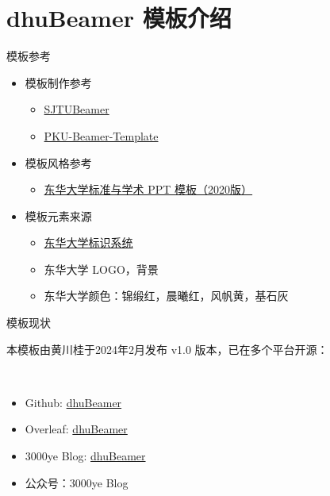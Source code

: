 \documentclass[12pt]{beamer}
\begin{document}
\section{dhuBeamer 模板介绍}
\begin{frame}{模板参考}

    \begin{itemize}
        \item 模板制作参考
        \begin{itemize}
            \item \href{https://github.com/sjtug/SJTUBeamer}{SJTUBeamer}
            \item \href{https://www.overleaf.com/latex/templates/bei-da-zhong-wen-mo-ban-pku-beamer-template/kfxpbtzrqhrn}{PKU-Beamer-Template}
        \end{itemize}
        \item 模板风格参考
        \begin{itemize}
            \item \href{https://www.dhu.edu.cn/_upload/article/files/d2/8c/2137ec0c44238fd6fbd3ee28ff07/9f9b566a-67f1-4717-991f-477ee5b43acb.zip}{东华大学标准与学术 PPT 模板（2020版）}
        \end{itemize}
        \item 模板元素来源
        \begin{itemize}
            \item \href{https://www.dhu.edu.cn/bsxt/listm.htm}{东华大学标识系统}
            \item 东华大学 LOGO，背景
            \item 东华大学颜色：锦缎红，晨曦红，风帆黄，基石灰
        \end{itemize}
    \end{itemize}

\end{frame}

\begin{frame}{模板现状}

    本模板由黄川桂于2024年2月发布 v1.0 版本，已在多个平台开源：

    ~\par

    \begin{itemize}
        \item Github: \href{https://github.com/3000ye/dhuBeamer}{dhuBeamer}
        \item Overleaf: \href{https://www.overleaf.com/latex/templates/dong-hua-da-xue-dhubeamer-mo-ban/wfqjdyjjnswr}{dhuBeamer}
        \item 3000ye Blog: \href{https://3000ye.com/p/dhubeamer/}{dhuBeamer}
        \item 公众号：3000ye Blog
    \end{itemize}

\end{frame}
\end{document}
